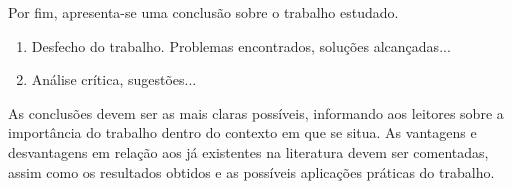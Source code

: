 Por fim, apresenta-se uma conclusão sobre o trabalho estudado.
\begin{enumerate}								
	\item  Desfecho do trabalho. Problemas encontrados, soluções alcançadas...
	\item  Análise crítica, sugestões...	
\end{enumerate}


As conclusões devem ser as mais claras possíveis, informando aos leitores sobre a importância do trabalho dentro do contexto em que se situa. As vantagens e desvantagens em relação aos já existentes na literatura devem ser comentadas, assim como os resultados obtidos e as possíveis aplicações práticas do trabalho.





\balance


